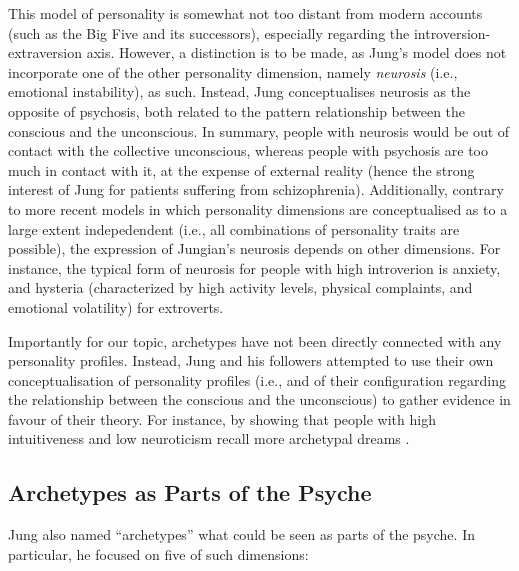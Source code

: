 \documentclass[
]{book}
\begin{document}
This model of personality is somewhat not too distant from modern accounts (such as the Big Five and its successors), especially regarding the introversion-extraversion axis. However, a distinction is to be made, as Jung's model does not incorporate one of the other personality dimension, namely \emph{neurosis} (i.e., emotional instability), as such. Instead, Jung conceptualises neurosis as the opposite of psychosis, both related to the pattern relationship between the conscious and the unconscious. In summary, people with neurosis would be out of contact with the collective unconscious, whereas people with psychosis are too much in contact with it, at the expense of external reality (hence the strong interest of Jung for patients suffering from schizophrenia). Additionally, contrary to more recent models in which personality dimensions are conceptualised as to a large extent indepedendent (i.e., all combinations of personality traits are possible), the expression of Jungian's neurosis depends on other dimensions. For instance, the typical form of neurosis for people with high introverion is anxiety, and hysteria (characterized by high activity levels, physical complaints, and emotional volatility) for extroverts.

Importantly for our topic, archetypes have not been directly connected with any personality profiles. Instead, Jung and his followers attempted to use their own conceptualisation of personality profiles (i.e., and of their configuration regarding the relationship between the conscious and the unconscious) to gather evidence in favour of their theory. For instance, by showing that people with high intuitiveness and low neuroticism recall more archetypal dreams \citep[i.e., dreams with less ``everydayness'';][]{kluger1975archetypal, cann1986jungian}.

\hypertarget{archetypes-as-parts-of-the-psyche}{%
\subsection{Archetypes as Parts of the Psyche}\label{archetypes-as-parts-of-the-psyche}}

Jung also named ``archetypes'' what could be seen as parts of the psyche. In particular, he focused on five of such dimensions:
\end{document}
